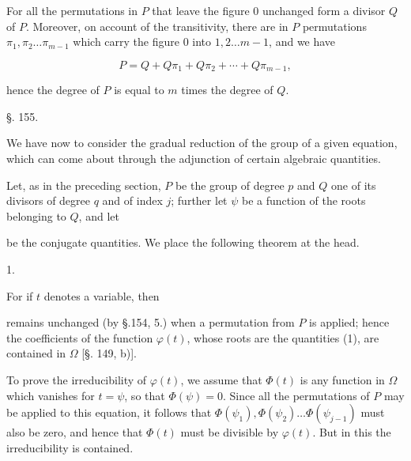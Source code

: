 
For all the permutations in $P$ that leave the figure $0$ unchanged
form a divisor $Q$ of $P$. Moreover, on account of the transitivity,
there are in $P$ permutations $\pi_1, \pi_2 \ldots \pi_{m-1}$ which carry the
figure $0$ into $1, 2 \ldots m-1$, and we have

\[
P = Q + Q\pi_1 + Q\pi_2 + \cdots + Q\pi_{m-1},
\]

hence the degree of $P$ is equal to $m$ times the degree of $Q$.

\begin{center}
§. 155.

\end{center}

We have now to consider the gradual reduction of the group
of a given equation, which can come about through the adjunction
of certain algebraic quantities.

Let, as in the preceding section, $P$ be the 
group of degree $p$ and $Q$ one of its divisors of degree $q$
and of index $j$; further let $\psi$ be a function of the roots
belonging to $Q$, and let


be the conjugate quantities. We place the following theorem
at the head.

1. 

For if $t$ denotes a variable, then


remains unchanged (by §.154, 5.) when a permutation from $P$ is
applied; hence the coefficients of the function $\varphi(t)$, whose
roots are the quantities (1), are contained in $\Omega$ [§. 149, b)].

To prove the irreducibility of $\varphi(t)$, we assume
that $\Phi(t)$ is any function in $\Omega$ which vanishes
for $t = \psi$, so that $\Phi(\psi) = 0$. Since all the permutations
of $P$ may be applied to this equation, it follows that
$\Phi(\psi_1), \Phi(\psi_2) \ldots \Phi(\psi_{j-1})$ must also be zero, and hence that $\Phi(t)$
must be divisible by $\varphi(t)$. But in this the irreducibility
is contained.
